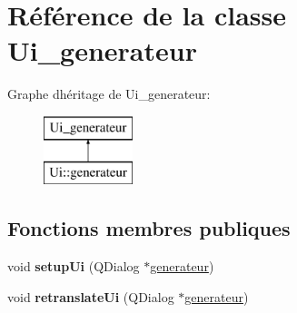 \hypertarget{class_ui__generateur}{}\section{Référence de la classe Ui\+\_\+generateur}
\label{class_ui__generateur}
Graphe d\textquotesingle{}héritage de Ui\+\_\+generateur\+:\begin{figure}[H]
\begin{center}
\leavevmode
\includegraphics[height=2.000000cm]{class_ui__generateur}
\end{center}
\end{figure}
\subsection*{Fonctions membres publiques}
\begin{DoxyCompactItemize}
\item 
\mbox{\label{class_ui__generateur_aaf157e6f2fbab6a16adbad778316a698}} 
void {\bfseries setup\+Ui} (Q\+Dialog $\ast$\mbox{\hyperlink{classgenerateur}{generateur}})
\item 
\mbox{\label{class_ui__generateur_a2ce1b8d1b06425332a976d48ad720622}} 
void {\bfseries retranslate\+Ui} (Q\+Dialog $\ast$\mbox{\hyperlink{classgenerateur}{generateur}})
\end{DoxyCompactItemize}
